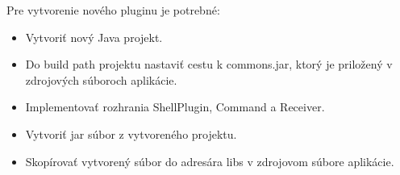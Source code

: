 Pre vytvorenie nového pluginu je potrebné:
\begin{itemize}
	\item Vytvoriť nový Java projekt.
	\item Do build path projektu nastaviť cestu k commons.jar, ktorý je priložený v zdrojových súboroch aplikácie.
	\item Implementovať rozhrania ShellPlugin, Command a Receiver.
	\item Vytvoriť \acrshort{jar} súbor z vytvoreného projektu.
	\item Skopírovať vytvorený súbor do adresára libs v zdrojovom súbore aplikácie.
\end{itemize}
